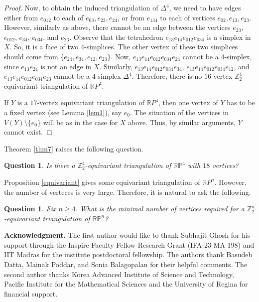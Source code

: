 \documentclass[11pt]{amsart}
\numberwithin{equation}{section}
\newtheorem{question}[theorem]{Question}
\theoremstyle{definition}
\newcommand{\RP}{\mathbb{RP}}
\def \bb{\mathbb}
\def \ZZ{{\bb{Z}}}
\begin{document}
\begin{proof}
Now, to obtain the induced triangulation of $\Delta^4$, we need to have edges either from $e_{012}$ to each of $e_{03}, e_{23}, e_{24}$, or from $e_{134}$ to each of vertices $e_{02}, e_{13}, e_{23}$. However, similarly as above, there cannot be an edge between the vertices  $e_{23}$, $e_{012}$, $e_{34}$, $e_{034}$, and $e_{23}$. Observe that the tetrahedron $e_{13}e_{14}e_{012}e_{034}$ is a simplex in $X$. So, it is a face of two $4$-simplices. The other vertex of these two simplices should come from $\{e_{24}, e_{34}, e_{12}, e_{23}\}$. Now, $e_{13}e_{14}e_{012}e_{034}e_{24}$ cannot be a $4$-simplex, since $e_{13}e_{24}$ is not an edge in $X$. Similarly, $e_{13}e_{14}e_{012}e_{034}e_{34}$, $e_{13}e_{14}e_{012}e_{034}e_{12}$, and $e_{13}e_{14}e_{012}e_{034}e_{23}$ cannot be a $4$-simplex  $\Delta^4$. Therefore, there is no $16$-vertex $\ZZ_2^4$-equivariant triangulation of $\mathbb{R}P^4$.

If $Y$ is a $17$-vertex equivariant triangulation of $\mathbb{R}P^4$, then one vertex of $Y$ has to be a fixed vertex (see Lemma \ref{lem1}), say $e_0$. The situation of the vertices in $V(Y)\setminus\{e_0\}$ will be as in the case for $X$ above. Thus, by similar arguments,  $Y$ cannot exist.  
\end{proof}

Theorem \ref{thm7} raises the following question.
\begin{question}
Is there a $\ZZ_2^4$-equivariant triangulation of $\RP^4$ with $18$ vertices?  
\end{question}

Proposition \ref{equivariant} gives some equivariant triangulation of $\mathbb{R}P^n$. However, the number of verteces is very large. Therefore, it is natural to ask the following.
\begin{question}
Fix $n\geq 4$. What is the minimal number of vertices required for a $\ZZ_2^n$-equivariant triangulation of $\RP^n$?
\end{question}




{\bf Acknowledgment.} The first author would like to thank Subhajit Ghosh for his support through the Inspire Faculty Fellow Research Grant (IFA-23-MA 198) and IIT Madras for the  institute postdoctoral fellowship.
The authors thank Basudeb Datta, Mainak Poddar, and Sonia Balagopalan
for their helpful comments. 
The second author thanks Korea Advanced Institute of Science and  Technology, Pacific Institute
for the Mathematical Sciences and the University of Regina for financial support.
\end{document}
